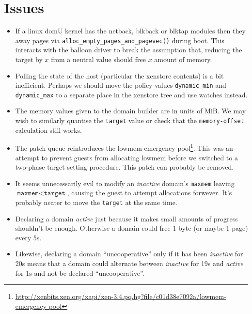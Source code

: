 \documentclass{article}
\begin{document}
\section{Issues}
\label{issues}
\begin{itemize}
\item If a linux domU kernel has the netback, blkback or blktap modules then they away pages via \texttt{alloc\_empty\_pages\_and\_pagevec()} during boot. This interacts with the balloon driver to break the assumption that, reducing the target by $x$ from a neutral value should free $x$ amount of memory.
\item Polling the state of the host (particular the xenstore contents) is a bit inefficient. Perhaps we should move the policy values \texttt{dynamic\_min} and \texttt{dynamic\_max} to a separate place in the xenstore tree and use watches instead.
\item The memory values given to the domain builder are in units of MiB. We may wish to similarly quantise the \texttt{target} value or check that the \texttt{memory-offset} calculation still works.
\item The \xen{} patch queue reintroduces the lowmem emergency pool\footnote{\url{http://xenbits.xen.org/xapi/xen-3.4.pq.hg?file/c01d38e7092a/lowmem-emergency-pool}}. This was an attempt to prevent guests from allocating lowmem before we switched to a two-phase target setting procedure. This patch can probably be removed.
\item It seems unnecessarily evil to modify an {\em inactive} domain's \texttt{maxmem} leaving $\texttt{maxmem}<\texttt{target}$, causing the guest to attempt allocations forwever. It's probably neater to move the \texttt{target} at the same time.
\item Declaring a domain {\em active} just because it makes small amounts of progress shouldn't be enough. Otherwise a domain could free 1 byte (or maybe 1 page) every 5s.
\item Likewise, declaring a domain ``uncooperative'' only if it has been {\em inactive} for 20s means that a domain could alternate between {\em inactive} for 19s and {\em active} for 1s and not be declared ``uncooperative''.
\end{itemize}
\appendix{}


\end{document}

